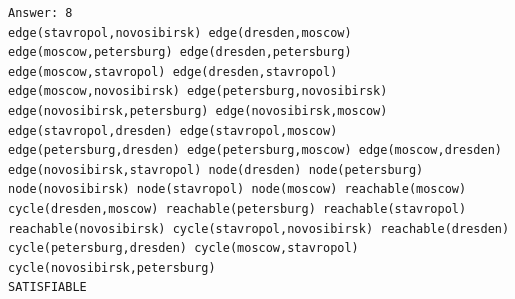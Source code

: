 \documentclass[dvipdfmx]{jsarticle}
\begin{document}
\begin{itemize}
\begin{verbatim}
Answer: 8
edge(stavropol,novosibirsk) edge(dresden,moscow) edge(moscow,petersburg) edge(dresden,petersburg) edge(moscow,stavropol) edge(dresden,stavropol) edge(moscow,novosibirsk) edge(petersburg,novosibirsk) edge(novosibirsk,petersburg) edge(novosibirsk,moscow) edge(stavropol,dresden) edge(stavropol,moscow) edge(petersburg,dresden) edge(petersburg,moscow) edge(moscow,dresden) edge(novosibirsk,stavropol) node(dresden) node(petersburg) node(novosibirsk) node(stavropol) node(moscow) reachable(moscow) cycle(dresden,moscow) reachable(petersburg) reachable(stavropol) reachable(novosibirsk) cycle(stavropol,novosibirsk) reachable(dresden) cycle(petersburg,dresden) cycle(moscow,stavropol) cycle(novosibirsk,petersburg)
SATISFIABLE

  \end{verbatim}
\end{itemize}
\end{document}
